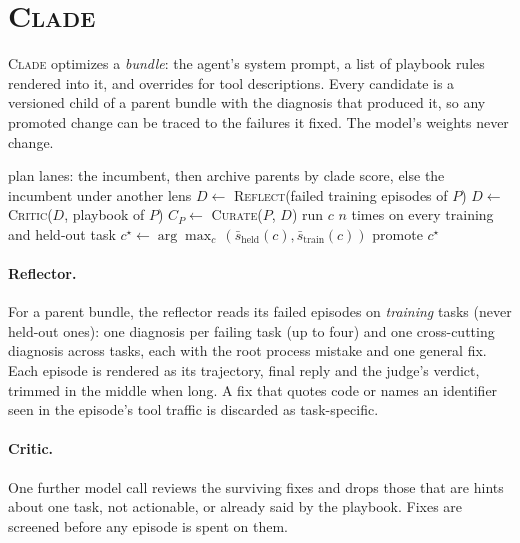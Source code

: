 \documentclass[11pt]{article}
\newcommand{\clade}{\textsc{Clade}\xspace}
\begin{document}
\section{\clade}
\label{sec:method}

\clade optimizes a \emph{bundle}: the agent's system prompt, a list of playbook rules rendered into it, and
overrides for tool descriptions. Every candidate is a versioned child of a parent bundle with the diagnosis that
produced it, so any promoted change can be traced to the failures it fixed. The model's weights never change.

\begin{algorithm}[t]
\caption{One \clade round}
\label{alg:clade}
\small
\begin{algorithmic}[1]
\State plan lanes: the incumbent, then archive parents by clade score, else the incumbent under another lens
  \State $D \gets$ \textsc{Reflect}(failed training episodes of $P$)
  \State $D \gets$ \textsc{Critic}($D$, playbook of $P$)
  \State $C_P \gets$ \textsc{Curate}($P$, $D$) 
\EndFor
{}
  \State run $c$ $n$ times on every training and held-out task
\EndFor
\State $c^\star \gets \arg\max_c\, (\bar s_{\mathrm{held}}(c), \bar s_{\mathrm{train}}(c))$
  \State promote $c^\star$
\EndIf
\end{algorithmic}
\end{algorithm}

\paragraph{Reflector.} For a parent bundle, the reflector reads its failed episodes on \emph{training} tasks (never
held-out ones): one diagnosis per failing task (up to four) and one cross-cutting diagnosis across tasks, each with
the root process mistake and one general fix. Each episode is rendered as its trajectory, final reply and the
judge's verdict, trimmed in the middle when long. A fix that quotes code or names an identifier seen in the
episode's tool traffic is discarded as task-specific.

\paragraph{Critic.} One further model call reviews the surviving fixes and drops those that are hints about one task,
not actionable, or already said by the playbook. Fixes are screened before any episode is spent on them.
\end{document}
